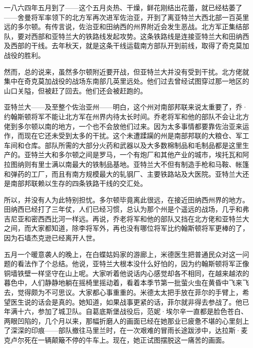 \par 一八六四年五月到了——这个五月炎热、干燥，鲜花刚结出花蕾，就已经枯萎了——舍曼将军率领下的北方军再次进军佐治亚，开到了离亚特兰大西北部一百英里远的多尔顿。有传言说，佐治亚和田纳西的州界附近会发生恶战。北方军正集结部队，要对西部和亚特兰大的铁路线发起攻势。这条铁路线是连接亚特兰大和田纳西及西部的干线。去年秋天，就是这条干线运载南方部队开到前线，取得了奇克莫加战役的胜利。
\par 然而，总的说来，虽然多尔顿附近要开战，但亚特兰大并没有受到干扰。北方佬就集中在奇克莫加战役的战场东南部几英里远处。他们过去曾经试图穿过那一地区的山口关隘，但被赶了回去。他们还会被赶跑的。
\par 亚特兰大——及至整个佐治亚州——明白，这个州对南部邦联来说太重要了，乔·约翰斯顿将军不能让北方军在州界内待太长时间。乔老将军和他的部队不会让北方佬到多尔顿以南的地方，一个也不会放他们过来。因为太多事情都要靠佐治亚来运作，而现在它还未受到太多的干扰。这个未遭蹂躏的州是南部邦联的大粮仓、军工车间和仓库。部队所需的大部分火药和武器以及大多数棉制品和毛制品都是这里生产的。亚特兰大和多尔顿之间是罗马，一个有炮厂和其他产业的城市，埃托瓦和阿拉图纳则有里士满以南最大的铁制品基地。亚特兰大不但有制造手枪和马鞍、帐篷和弹药的工厂，而且有南方规模最大的轧钢厂、主要铁路站及大医院。亚特兰大还是南部邦联赖以生存的四条铁路干线的交汇处。
\par 所以，并没有人为此特别担忧。多尔顿毕竟离此很远，在接近田纳西州界的地方。田纳西已经打了三年仗，人们已经习惯，总认为那个州是个遥远的战场，几乎和弗吉尼亚和密西西比河一样远。再说，乔老将军和他的部队又挡在北方佬和亚特兰大之间，而大家都知道，除李将军外，再也没有哪位将军比约翰斯顿将军更棒的了，因为石墙杰克逊已经离开人世。
\par 五月一个暖意袭人的晚上，在白蝶姑妈家的游廊上，米德医生把普通民众对这一问题的看法作了个总结。他说，亚特兰大根本没什么好怕的，因为约翰斯顿将军正像铜墙铁壁一样坚守在山上呢。大家听着他说话内心感觉却各不相同，在越来越浓的暮色中，人们静静地躺在摇椅里摇动着，看着本季节第一批萤火虫在黄昏中飞来飞去，觉得颇为不可思议。大家都心事重重的。米德太太把手放在菲尔的手臂上，希望医生说的话会是真的。她知道，如果战事更紧的话，菲尔就非得去参战了。他已年满十六，参加了城卫队。自葛底斯堡战役后，范妮·埃尔辛一直都是脸色苍白、两眼凹陷的，几个月以来，那幅折磨人的画面已经在她那业已疲惫不堪的心里刻上了深深的印痕——部队撤往马里兰时，在一次艰难的冒雨长途跋涉中，达拉斯·麦克卢尔死在一辆颠簸不停的牛车上。现在，她正试图摆脱这一痛苦的画面。
